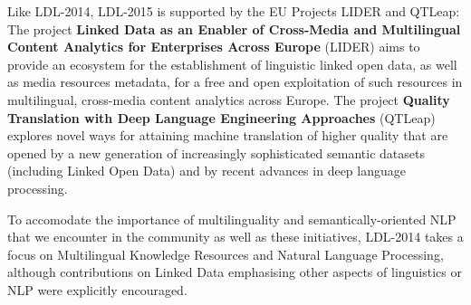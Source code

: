 Like LDL-2014, LDL-2015 is supported by the EU Projects LIDER and QTLeap:
The project \textbf{Linked Data as an Enabler of Cross-Media and Multilingual Content Analytics for Enterprises Across Europe} (LIDER) aims to provide an 
ecosystem for the establishment of linguistic linked open data, as well as media resources metadata, for a free and open exploitation of such resources in 
multilingual, cross-media content analytics across Europe. 
The project \textbf{Quality Translation with Deep Language Engineering Approaches} (QTLeap) explores novel ways for attaining machine translation of higher quality that are opened by a new generation of increasingly sophisticated semantic datasets (including Linked Open Data) and by recent advances in deep language processing.

To accomodate the importance of multilinguality and semantically-oriented NLP that we encounter in the community as well as these initiatives, LDL-2014 takes a focus on Multilingual Knowledge Resources and Natural Language Processing, although contributions on Linked Data emphasising other aspects of linguistics or NLP were explicitly encouraged.